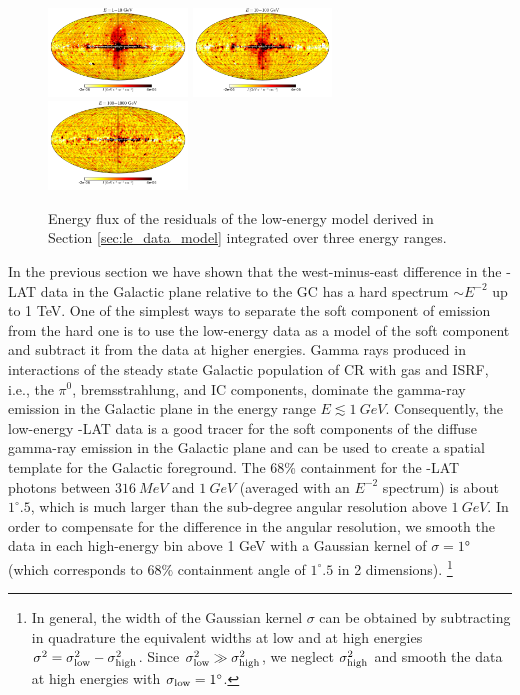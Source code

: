 \begin{figure}[t]
\includegraphics[width=0.33\textwidth]{plots/Mollweide_LowE_03-10GeV_flux_source_range_0.pdf}
\includegraphics[width=0.33\textwidth]{plots/Mollweide_LowE_03-10GeV_flux_source_range_1.pdf}
\includegraphics[width=0.33\textwidth]{plots/Mollweide_LowE_03-10GeV_flux_source_range_2.pdf}
\caption{Energy flux of the residuals of the low-energy model derived in Section \ref{sec:le_data_model}
integrated over three energy ranges. }
\label{fig:Maps_lowE}
\end{figure}


In the previous section we have shown that the west-minus-east difference in the \Fermi-LAT data in the Galactic plane relative to the GC has a hard 
spectrum $\sim E^{-2}$ up to 1 TeV.
One of the simplest ways to separate the soft component of emission from the hard one is to use the low-energy data as
a model of the soft component and subtract it from the data at higher energies.
Gamma rays produced in interactions of the steady state Galactic population of CR with gas and ISRF,
i.e., the $\pi^0$, bremsstrahlung, and IC components,
dominate the gamma-ray emission in the Galactic plane in the energy range $E \lesssim \SI{1}{GeV}$. 
Consequently, the low-energy \Fermi-LAT data is a good tracer for the soft components of the
diffuse gamma-ray emission in the Galactic plane and can be used to create a spatial template for the Galactic foreground.
The 68\% containment for the \Fermi-LAT photons between $\SI{316}{MeV}$ and $\SI{1}{GeV}$ (averaged with an $E^{-2}$ spectrum) is about $1^\circ\!\!.5$,
which is much larger than the sub-degree angular resolution above $\SI{1}{GeV}$.
In order to compensate for the difference in the angular resolution, 
we smooth the data in each high-energy bin above 1 GeV
with a Gaussian kernel of $\sigma = \ang{1}$ (which corresponds to $68\%$ containment angle of
$1^\circ\!\!.5$ in 2 dimensions).%
\footnote{In general, the width of the Gaussian kernel $\sigma$ can be obtained by subtracting in quadrature
the equivalent widths at low and at high energies $\sigma^2 = \sigma_{\rm low}^2 - \sigma_{\rm high}^2$.
Since $\sigma_{\rm low}^2 \gg \sigma_{\rm high}^2$, we neglect $\sigma_{\rm high}^2$ and smooth the 
data at high energies with $\sigma_{\rm low} = 1^\circ$.}

